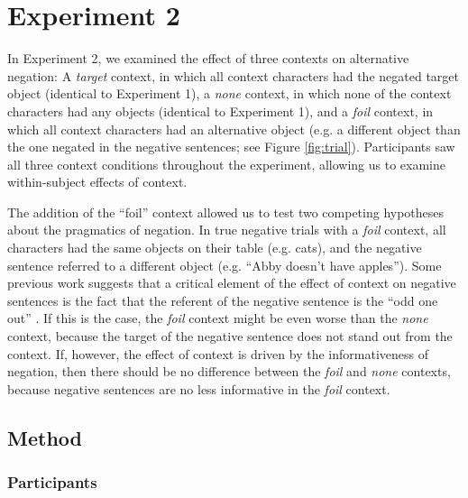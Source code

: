 \documentclass[man, noapacite]{apa2}
\begin{document}
\section{Experiment 2}

In Experiment 2, we examined the effect of three contexts on alternative negation: A \emph{target} context, in which all context characters had the negated target object (identical to Experiment 1), a \emph{none} context, in which none of the context characters had any objects (identical to Experiment 1), and a \emph{foil} context, in which all context characters had an alternative object (e.g. a different object than the one negated in the negative sentences; see Figure \ref{fig:trial}).  Participants saw all three context conditions throughout the experiment, allowing us to examine within-subject effects of context.  

The addition of the ``foil'' context allowed us to test two competing hypotheses about the pragmatics of negation.  In true negative trials with a \emph{foil} context, all characters had the same objects on their table (e.g. cats), and the negative sentence referred to a different object (e.g. ``Abby doesn't have apples'').  Some previous work suggests that a critical element of the effect of context on negative sentences is the fact that the referent of the negative sentence is the ``odd one out'' \cite{wason1965}.  If this is the case, the \emph{foil} context might be even worse than the \emph{none} context, because the target of the negative sentence does not stand out from the context.  If, however, the effect of context is driven by the informativeness of negation, then there should be no difference between the \emph{foil} and \emph{none} contexts, because negative sentences are no less informative in the \emph{foil} context.  


\subsection{Method}

\subsubsection{Participants}
\end{document}
